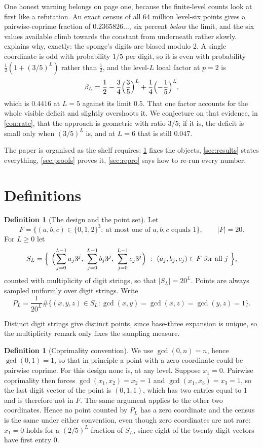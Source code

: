 \documentclass[11pt]{amsart}
\theoremstyle{definition}
\newtheorem{definition}[theorem]{Definition}
\theoremstyle{remark}
\begin{document}
One honest warning belongs on page one, because the finite-level counts look at first like a refutation. An exact census of all $64$ million level-six points gives a pairwise-coprime fraction of $0.2365826\ldots$, six percent \emph{below} the limit, and the six values available climb towards the constant from underneath rather slowly.  explains why, exactly: the sponge's digits are biased modulo $2$. A single coordinate is odd with probability $1/5$ per digit, so it is even with probability $\frac12(1+(3/5)^L)$ rather than $\frac12$, and the level-$L$ local factor at $p=2$ is
\[
\beta_L=\frac12-\frac34\Bigl(\frac35\Bigr)^{L}+\frac14\Bigl(-\frac15\Bigr)^{L},
\]
which is $0.4416$ at $L=5$ against its limit $0.5$. That one factor accounts for the whole visible deficit and slightly overshoots it. We conjecture on that evidence, in \cref{con:rate}, that the approach is geometric with ratio $3/5$; if it is, the deficit is small only when $(3/5)^L$ is, and at $L=6$ that is still $0.047$.

The paper is organised as the shelf requires: \cref{sec:def} fixes the objects, \cref{sec:results} states everything, \cref{sec:proofs} proves it, \cref{sec:repro} says how to re-run every number.

\section{Definitions}
\label{sec:def}

\begin{definition}[The design and the point set]
\label{def:sponge}
Let
\[
F=\bigl\{(a,b,c)\in\{0,1,2\}^3:\ \text{at most one of }a,b,c\text{ equals }1\bigr\},
\qquad |F|=20 .
\]
For $L\ge0$ let
\[
S_L=\Bigl\{\ \Bigl(\sum_{j=0}^{L-1}a_j3^j,\ \sum_{j=0}^{L-1}b_j3^j,\ \sum_{j=0}^{L-1}c_j3^j\Bigr)\ :\ (a_j,b_j,c_j)\in F\ \text{for all }j\ \Bigr\},
\]
counted with multiplicity of digit strings, so that $|S_L|=20^L$. Points are always sampled uniformly over digit strings. Write
\[
P_L=\frac{1}{20^L}\#\bigl\{(x,y,z)\in S_L:\gcd(x,y)=\gcd(x,z)=\gcd(y,z)=1\bigr\}.
\]
\end{definition}

Distinct digit strings give distinct points, since base-three expansion is unique, so the multiplicity remark only fixes the sampling measure.

\begin{definition}[Coprimality convention]
\label{def:gcd}
We use $\gcd(0,n)=n$, hence $\gcd(0,1)=1$, so that in principle a point with a zero coordinate could be pairwise coprime. For this design none is, at any level. Suppose $x_1=0$. Pairwise coprimality then forces $\gcd(x_1,x_2)=x_2=1$ and $\gcd(x_1,x_3)=x_3=1$, so the last digit vector of the point is $(0,1,1)$, which has two entries equal to $1$ and is therefore not in $F$. The same argument applies to the other two coordinates. Hence no point counted by $P_L$ has a zero coordinate and the census is the same under either convention, even though zero coordinates are not rare: $x_1=0$ holds for a $(2/5)^L$ fraction of $S_L$, since eight of the twenty digit vectors have first entry $0$.
\end{definition}
\end{document}

